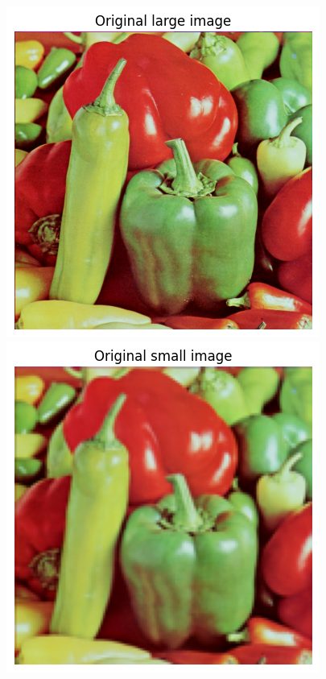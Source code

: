 \begin{answer}
\begin{figure}[!h]
  \includegraphics[width=\linewidth]{k_means/orig_large.png}
\endminipage\hfill
{}
  \includegraphics[width=\linewidth]{k_means/orig_small.png}

\end{figure}
\end{answer}
